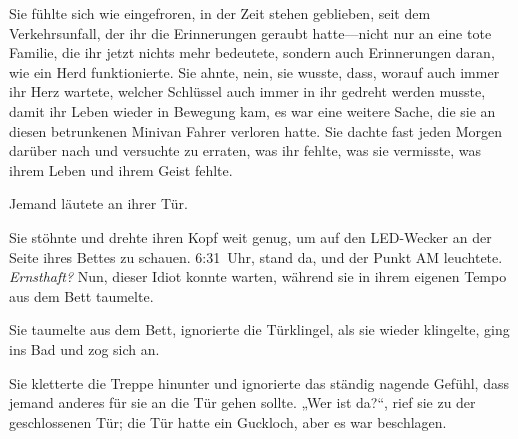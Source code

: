 Sie fühlte sich wie eingefroren, in der Zeit stehen geblieben, seit dem Verkehrsunfall, der ihr die Erinnerungen geraubt hatte—nicht nur an eine tote Familie, die ihr jetzt nichts mehr bedeutete, sondern auch Erinnerungen daran, wie ein Herd funktionierte.
Sie ahnte, nein, sie wusste, dass, worauf auch immer ihr Herz wartete, welcher Schlüssel auch immer in ihr gedreht werden musste, damit ihr Leben wieder in Bewegung kam, es war eine weitere Sache, die sie an diesen betrunkenen Minivan Fahrer verloren hatte. Sie dachte fast jeden Morgen darüber nach und versuchte zu erraten, was ihr fehlte, was sie vermisste, was ihrem Leben und ihrem Geist fehlte.

Jemand läutete an ihrer Tür.

Sie stöhnte und drehte ihren Kopf weit genug, um auf den LED-Wecker an der Seite ihres Bettes zu schauen.
6:31~Uhr, stand da, und der Punkt AM leuchtete.
\emph{Ernsthaft?} Nun, dieser Idiot konnte warten, während sie in ihrem eigenen Tempo aus dem Bett taumelte.

Sie taumelte aus dem Bett, ignorierte die Türklingel, als sie wieder klingelte, ging ins Bad und zog sich an.

Sie kletterte die Treppe hinunter und ignorierte das ständig nagende Gefühl, dass jemand anderes für sie an die Tür gehen sollte.
„Wer ist da?“, rief sie zu der geschlossenen Tür; die Tür hatte ein Guckloch, aber es war beschlagen.

